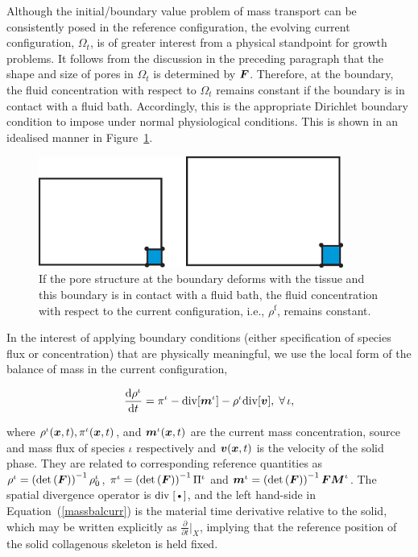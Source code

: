 Although the initial/boundary value problem of mass transport can be
consistently posed in the reference configuration, the evolving
current configuration, $\Omega_t$, is of greater interest from a
physical standpoint for growth problems. It follows from the
discussion in the preceding paragraph that the shape and size of
pores in $\Omega_t$ is determined by $\mbox{\boldmath$ F$}$. Therefore, at
the boundary, the fluid concentration with 
respect to $\Omega_t$ remains constant if the boundary is in contact
with a fluid bath.  Accordingly, this is the appropriate Dirichlet
boundary condition to impose under normal physiological
conditions. This is shown in an idealised manner in Figure~\ref{fbc}.

\begin{figure}
\centering
\includegraphics[width=10.00cm]{images/concentration.eps}
\caption{If the pore structure at the boundary deforms with the
tissue and this boundary is in contact with a fluid bath, the
fluid concentration with respect to the current configuration,
i.e., $\rho^\mathrm{f}$, remains constant.}\label{fbc}
\end{figure}

In the interest of applying boundary conditions (either specification
of species flux or concentration) that are physically meaningful, we
use the local form of the balance of mass in the current
configuration,

\begin{equation}
\frac{\mathrm{d}\rho^\iota}{\mathrm{d}t} = \pi^\iota-
\mathrm{\small{div}}[\mbox{\boldmath$ m$}^\iota] - \rho^\iota
\mathrm{\small{div}}[\mbox{\boldmath$ v$}],\;\forall\,\iota, \label{massbalcurr}
\end{equation}

\noindent where $\rho^\iota(\mbox{\boldmath$ x$},t),\pi^\iota(\mbox{\boldmath$ x$},t)$, and
$\mbox{\boldmath$ m$}^\iota(\mbox{\boldmath$ x$},t)$ are the current mass concentration, source and mass
flux of species $\iota$ respectively and $\mbox{\boldmath$ v$}(\mbox{\boldmath$ x$},t)$ is the velocity
of the solid phase. They are related to corresponding reference
quantities as $\rho^\iota = \left(\mathrm{det} \left(\mbox{\boldmath$ F$}\right)
\right)^{-1} \rho_0^\iota$, $\pi^\iota = \left(\mathrm{det}
\left(\mbox{\boldmath$ F$}\right) \right)^{-1} \Pi^\iota$ and $\mbox{\boldmath$ m$}^\iota =
\left(\mathrm{det} \left(\mbox{\boldmath$ F$}\right) \right)^{-1} \mbox{\boldmath$ F$} \mbox{\boldmath$ M$}^\iota$. The
spatial divergence operator is $\mbox{\small{div} [\textbullet]}$, and
the left hand-side in Equation~(\ref{massbalcurr}) is the material
time derivative relative to the solid, which may be written explicitly as
$\frac{\partial}{\partial t}\vert_X$, implying that the reference
position of the solid collagenous skeleton is held fixed.

